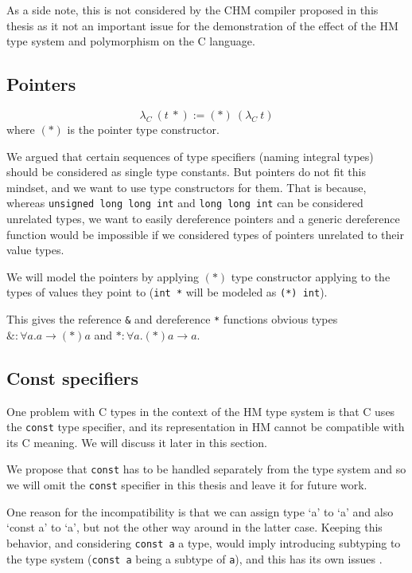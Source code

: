 As a side note, this is not considered by the CHM compiler proposed in this thesis as it not an important issue for the demonstration of the effect of the HM type system and polymorphism on the C language.

\subsection{Pointers}

\begin{defn}
    $$\lambda_C\ (t\ *) := (*)\ (\lambda_C\ t)$$
    where $(*)$ is the pointer type constructor.
\end{defn}

We argued that certain sequences of type specifiers (naming integral types) should be considered as single type constants. But pointers do not fit this mindset, and we want to use type constructors for them. That is because, whereas \lstinline{unsigned long long int} and \lstinline{long long int} can be considered unrelated types, we want to easily dereference pointers and a generic dereference function would be impossible if we considered types of pointers unrelated to their value types.

We will model the pointers by applying $(*)$ type constructor applying to the types of values they point to (\lstinline{int *} will be modeled as \lstinline{(*) int}).

This gives the reference \lstinline{&} and dereference \lstinline{*} functions obvious types $\&: \forall a . a \rightarrow (*) a$ and $*: \forall a . (*) a \rightarrow a$.

\subsection{Const specifiers}

One problem with C types in the context of the HM type system is that C uses the \lstinline{const} type specifier, and its representation in HM cannot be compatible with its C meaning. We will discuss it later in this section.

We propose that \lstinline{const} has to be handled separately from the type system and so we will omit the \lstinline{const} specifier in this thesis and leave it for future work.

One reason for the incompatibility is that we can assign type `a' to `a' and also `const a' to `a', but not the other way around in the latter case. Keeping this behavior, and considering \lstinline{const a} a type, would imply introducing subtyping to the type system (\lstinline{const a} being a subtype of \lstinline{a}), and this has its own issues \cite{palsberg2012overloading}.

